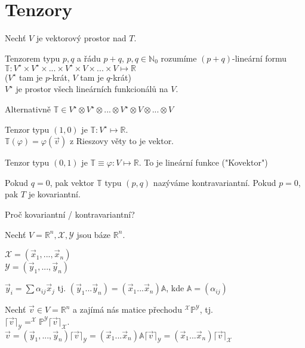 \documentclass[../main.tex]{subfiles}
\begin{document}
\section{Tenzory}

Nechť $V$ je vektorový prostor nad $T$. 

Tenzorem typu $p,q$ a řádu $p+q$, $p,q\in\mathbb{N}_0$ rozumíme $(p+q)$-lineární formu\\
$\mathbb{T}: V^\star \times V^\star \times ... \times V^\star \times V \times ... \times V \mapsto \mathbb{R}$\\
($V^\star$ tam je $p$-krát, $V$ tam je $q$-krát)\\
$V^\star$ je prostor všech lineárních funkcionálů na $V$.

Alternativně
$\mathbb{T} \in V^\star \otimes V^\star \otimes ... \otimes V^\star \otimes V \otimes ... \otimes V $


\begin{example}
    Tenzor typu $(1, 0)$ je $\mathbb{T}: V^\star \mapsto \mathbb{R}$.\\
    $\mathbb{T}(\varphi) = \varphi(\vec{v})$ z Rieszovy věty to je vektor.

    Tenzor typu $(0 ,1)$ je $\mathbb{T} \equiv \varphi: V \mapsto \mathbb{R}$. To je lineární funkce ("Kovektor")
\end{example}

\begin{definition}
    Pokud $q=0$, pak vektor $\mathbb{T}$ typu $(p,q)$ nazýváme kontravariantní. Pokud $p=0$, pak $T$ je kovariantní.
\end{definition}


Proč kovariantní / kontravariantní? 

Nechť $V = \mathbb{R}^n, \mathcal{X}, \mathcal{Y}$ jsou báze $\mathbb{R}^n$.

$\mathcal{X} = (\vec{x}_1, ... , \vec{x}_n)$\\
$\mathcal{Y} = (\vec{y}_1, ... , \vec{y}_n)$

$\vec{y}_i = \sum \alpha_{ij} \vec{x}_j$ tj. $(\vec{y}_1 ... \vec{y}_n) = (\vec{x}_1 ... \vec{x}_n) \mathbb{A}$, kde $\mathbb{A} = (\alpha_{ij})$

Nechť $\vec{v}\in V = \mathbb{R}^n$ a zajímá nás matice přechodu $^\mathcal{X}\mathbb{P}^\mathcal{Y}$, tj.\\
$\lceil\vec{v}\rceil_\mathcal{Y} = ^\mathcal{X}\mathbb{P}^\mathcal{Y} \lceil\vec{v}\rceil_\mathcal{X} $.\\
$\vec{v} = (\vec{y}_1, ... , \vec{y}_n) \lceil\vec{v}\rceil_\mathcal{Y} =
 (\vec{x}_1 ... \vec{x}_n) \mathbb{A}\lceil\vec{v}\rceil_\mathcal{Y} =
 (\vec{x}_1 ... \vec{x}_n) \lceil\vec{v}\rceil_\mathcal{X}$
\end{document}
